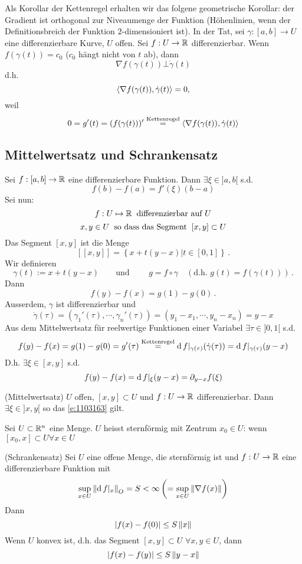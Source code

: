\begin{Bem}
Als Korollar der Kettenregel erhalten wir das folgene geometrische Korollar:
der Gradient ist orthogonal zur Niveaumenge der Funktion (Höhenlinien, wenn der Definitionsbreich
der Funktion $2$-dimensioniert ist).
In der Tat, sei $\gamma:[a,b]\to U$ eine differenzierbare Kurve, $U$ offen. Sei $f:U\rightarrow\mathbb{R}$ differenzierbar. Wenn $f(\gamma(t))=c_0$ ($c_0$ hängt nicht von $t$ ab), dann
  \[\nabla f(\gamma(t))\bot \dot\gamma(t)\]
  d.h.
  \[\langle \nabla f(\gamma(t)), \dot\gamma(t)  \rangle=0,\]
weil
  \[0=g'(t)=(f(\gamma(t)))'\stackrel{\text{Kettenregel}}{=}\langle \nabla f(\gamma(t)), \dot\gamma(t) \rangle\]
\end{Bem}
\subsection{Mittelwertsatz und Schrankensatz}
 Sei $f:[a,b]\rightarrow\mathbb{R}$ eine differenzierbare Funktion. Dann $\exists \xi\in ]a,b[$ s.d.
  \[f(b)-f(a)=f'(\xi)(b-a)\]
  Sei nun:
  \[f:U\mapsto\mathbb{R}\hspace{2mm}\text{differenzierbar auf $U$}\]
  \[x,y\in U\hspace{2mm}\text{so dass das Segment}\hspace{2mm}[x,y]\subset U\]
 Das Segment $[x,y]$ ist die Menge
 \[\left[ [x,y] \right]=\left\{ x+t(y-x)|t\in \left[ 0,1 \right] \right\}\, .\]
Wir definieren
  \[\gamma(t):= x+t(y-x)  \qquad \mbox{und } \qquad g=f\circ \gamma \quad
(\mbox{d.h. }g(t)=f(\gamma(t)))\, .\]
Dann
  \[f(y)-f(x)=g(1)-g(0) \, .\]
Ausserdem, $\gamma$ ist differenzierbar und
\[\dot\gamma(\tau)=(\gamma_1'(\tau),\cdots,\gamma_n'(\tau))
=(y_1-x_1,\cdots,y_n-x_n)=y-x\]
Aus dem Mittelwertsatz f\"ur reelwertige Funktionen einer Variabel $\exists \tau\in ]0,1[$ s.d.
  \[f(y) - f(x) = g(1)-g(0)=g'(\tau)\stackrel{\text{Kettenregel}}{=} \operatorname{d} f|_{\gamma(\tau)}(\dot\gamma(\tau))
= \operatorname{d} f|_{\gamma(\tau)} (y-x)\]
  D.h. $\exists \xi\in [x,y]$ s.d.
  \begin{equation}
    \label{e:1103163}
    f(y)-f(x)=\operatorname{d} f|_\xi(y-x)=\partial_{y-x}f(\xi)
  \end{equation}
\begin{Sat}
  (Mittelwertsatz) $U$ offen, $[x,y]\subset U$ und $f:U\rightarrow\mathbb{R}$ differenzierbar. Dann $\exists \xi\in ]x,y[$ so das \eqref{e:1103163} gilt.
\end{Sat}
\begin{Def}
Sei $U\subset \mathbb{R}^n$ eine Menge. $U$ heisst sternförmig mit Zentrum $x_0\in U$: wenn $[x_0, x]\subset U
\forall x\in U$
\end{Def}
\begin{Sat}
  (Schrankensatz) Sei $U$ eine offene Menge, die sternförmig ist und $f:U\rightarrow\mathbb{R}$ eine differenzierbare Funktion mit
  \[\sup_{x\in U}\left\| \operatorname{d} f|_x \right\|_{O}=S<\infty \left( =\sup_{x\in U}\left\| \nabla f(x) \right\| \right)\]
  Dann
  \[\left| f(x)-f(0) \right|\leq S\left\| x \right\|\]
  Wenn $U$ konvex ist, d.h. das Segment $[x,y]\subset U$ $\forall x,y\in U$, dann
  \[\left| f(x)-f(y) \right|\leq S\left\| y-x \right\|\]
\end{Sat}
